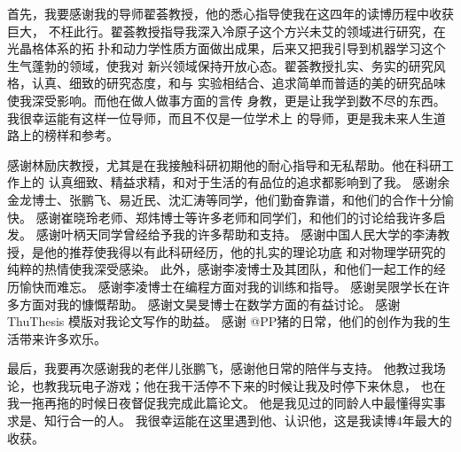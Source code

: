 \begin{acknowledgement}

首先，我要感谢我的导师翟荟教授，他的悉心指导使我在这四年的读博历程中收获巨大，
不枉此行。翟荟教授指导我深入冷原子这个方兴未艾的领域进行研究，在光晶格体系的拓
扑和动力学性质方面做出成果，后来又把我引导到机器学习这个生气蓬勃的领域，使我对
新兴领域保持开放心态。翟荟教授扎实、务实的研究风格，认真、细致的研究态度，和与
实验相结合、追求简单而普适的美的研究品味使我深受影响。而他在做人做事方面的言传
身教，更是让我学到数不尽的东西。我很幸运能有这样一位导师，而且不仅是一位学术上
的导师，更是我未来人生道路上的榜样和参考。

感谢林励庆教授，尤其是在我接触科研初期他的耐心指导和无私帮助。他在科研工作上的
认真细致、精益求精，和对于生活的有品位的追求都影响到了我。
感谢余金龙博士、张鹏飞、易近民、沈汇涛等同学，他们勤奋靠谱，和他们的合作十分愉快。
感谢崔晓玲老师、郑炜博士等许多老师和同学们，和他们的讨论给我许多启发。
感谢叶柄天同学曾经给予我的许多帮助和支持。
感谢中国人民大学的李涛教授，是他的推荐使我得以有此科研经历，他的扎实的理论功底
和对物理学研究的纯粹的热情使我深受感染。
此外，感谢李凌博士及其团队，和他们一起工作的经历愉快而难忘。
感谢李凌博士在编程方面对我的训练和指导。
感谢吴限学长在许多方面对我的慷慨帮助。
感谢文昊旻博士在数学方面的有益讨论。
感谢 ThuThesis 模版对我论文写作的助益。
感谢 @PP猪的日常，他们的创作为我的生活带来许多欢乐。

最后，我要再次感谢我的老伴儿张鹏飞，感谢他日常的陪伴与支持。
他教过我场论，也教我玩电子游戏；他在我干活停不下来的时候让我及时停下来休息，
也在我一拖再拖的时候日夜督促我完成此篇论文。
他是我见过的同龄人中最懂得实事求是、知行合一的人。
我很幸运能在这里遇到他、认识他，这是我读博4年最大的收获。


\end{acknowledgement}
